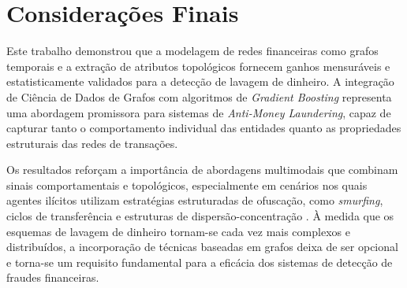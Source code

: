 \documentclass[a4paper,12pt,oneside,onecolumn,final,fleqn]{repUERJ}
\begin{document}
\section{Considerações Finais}

Este trabalho demonstrou que a modelagem de redes financeiras como grafos temporais e a extração de atributos topológicos fornecem ganhos mensuráveis e estatisticamente validados para a detecção de lavagem de dinheiro. A integração de Ciência de Dados de Grafos com algoritmos de \textit{Gradient Boosting} representa uma abordagem promissora para sistemas de \textit{Anti-Money Laundering}, capaz de capturar tanto o comportamento individual das entidades quanto as propriedades estruturais das redes de transações.

Os resultados reforçam a importância de abordagens multimodais que combinam sinais comportamentais e topológicos, especialmente em cenários nos quais agentes ilícitos utilizam estratégias estruturadas de ofuscação, como \textit{smurfing}, ciclos de transferência e estruturas de dispersão-concentração \cite{cheng2025graph, tiwari2020review, chainalysis2025crypto}. À medida que os esquemas de lavagem de dinheiro tornam-se cada vez mais complexos e distribuídos, a incorporação de técnicas baseadas em grafos deixa de ser opcional e torna-se um requisito fundamental para a eficácia dos sistemas de detecção de fraudes financeiras.



\end{document}
